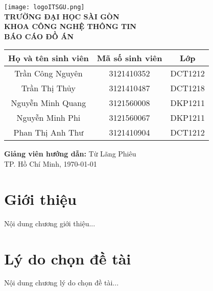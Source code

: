 \documentclass[a4paper,12pt]{report}  %
\begin{document}

\begin{titlepage}
    \centering
    \texttt{[image: logoITSGU.png]} \\[1cm]
    \textbf{\Large TRƯỜNG ĐẠI HỌC SÀI GÒN} \\[0.5cm]
    \textbf{\Large KHOA CÔNG NGHỆ THÔNG TIN} \\[2cm]
    {\Huge \textbf{BÁO CÁO ĐỒ ÁN}} \\[2cm]

    \begin{center}
        \begin{tabular}{|c|c|c|}
            \hline
            \textbf{Họ và tên sinh viên} & \textbf{Mã số sinh viên} & \textbf{Lớp} \\
            \hline
            Trần Công Nguyên & 3121410352 & DCT1212 \\
            \hline
            Trần Thị Thủy & 3121410487 & DCT1218 \\
            \hline
            Nguyễn Minh Quang & 3121560008 & DKP1211 \\
            \hline
            Nguyễn Minh Phi & 3121560067 & DKP1211 \\
            \hline
            Phan Thị Anh Thư & 3121410904 & DCT1212 \\
            \hline
        \end{tabular}
    \end{center}
    
    \vspace{1cm}
    \textbf{Giảng viên hướng dẫn:} Từ Lãng Phiêu \\

    \vfill
    TP. Hồ Chí Minh, \today
\end{titlepage}

\newpage  %

\tableofcontents
\newpage

\chapter{Giới thiệu}
Nội dung chương giới thiệu...

\chapter{Lý do chọn đề tài}
Nội dung chương lý do chọn đề tài...
\end{document}
